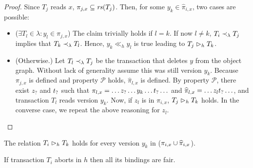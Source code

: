 \begin{proof}

  Since $T_j$ reads $x$, $\pi_{j,x} \subseteq \readSetOf{T_j}$.
  Then, for some $y_k \in \hat{\pi}_{i,x}$, two cases are possible:
  \begin{itemize}
  \item ($\exists T_l \in \lambda : y_l  \in \pi_{j,x}$)
    The claim trivially holds if $l = k$.
    If now $l \neq k$, $T_i \hb_{\lambda} T_j$ implies that $T_k \hb_{\lambda} T_l$.
    Hence, $y_k \ll_{h} y_l$ is true leading to $T_j \depends_h T_k$.
  \item (Otherwise.)
    Let $T_l \hb_{\lambda} T_j$ be the transaction that deletes $y$ from the object graph.
    Without lack of generality assume this was still version $y_k$.
    Because $\pi_{j,x}$ is defined and property $\mathcal{P}$ holds, $\hat{\pi}_{l,x}$ is defined.
    By property $\mathcal{P}$, there exist $z_{?}$ and $t_{\versionAny}$ such that
    $\pi_{l,x} = \ldots z_{?} \ldots y_{k} \ldots t_{\versionAny} \ldots$
    and $\hat{\pi}_{l,x} = \ldots z_{l}t_{\versionAny} \ldots$, and transaction $T_l$ reads version $y_{k}$.
    Now, if $z_l$ is in $\pi_{i,x}$, $T_j \depends_h T_k$ holds.
    In the converse case, we repeat the above reasoning for $z_l$.
  \end{itemize}     
    
\end{proof}

\begin{corollary}
  The relation $T_i \depends_h T_k$ holds for every version $y_k$ in ($\pi_{i,x} \cup \widehat{\pi}_{i,x}$).
\end{corollary}

\begin{lemma}
  If transaction $T_i$ aborts in $h$ then all its bindings are fair.
\end{lemma}

